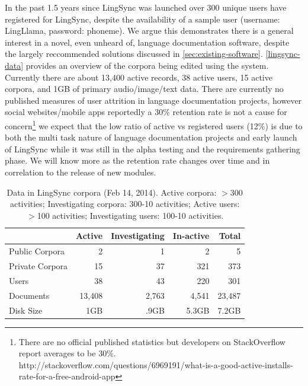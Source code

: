 \documentclass[11pt]{article}
\newcommand{\smalltodo}[2][]
    {\todo[caption={#2}, #1]
    {\tiny#2\normalsize}}
\begin{document}
In the past 1.5 years since LingSync was launched over 300  unique
users  have registered for LingSync, despite the availability of a sample user (username: LingLlama, password: phoneme). We argue this demonstrates there is a general interest in a novel, even  unheard of, language documentation software, despite the largely reccommended  solutions discussed in \autoref{sec:existing-software}.
\autoref{lingsync-data} provides an
overview of the corpora being edited using the system. Currently there are
about 13,400 active records, 38 active users, 15 active corpora, and 1GB of
primary audio/image/text data. There are currently no published measures of user attrition in language documentation projects, however social websites/mobile apps reportedly a  30\% retention rate is not a cause for concern\footnote{There are no official published statistics but developers on StackOverflow report averages to be 30\%. http://stackoverflow.com/questions/6969191/what-is-a-good-active-installs-rate-for-a-free-android-app} we expect that the low ratio of active vs registered users (12\%) is due to both the multi task nature of language documentation projects and early launch of LingSync while it was still in the alpha testing and the requirements gathering phase. We will know more as the retention rate changes over time and in correlation to the release of new modules.


\begin{table}[h]
\begin{center}
\scriptsize
\begin{tabular}{lrrrr}
      \toprule
                     ~ &  Active & Investigating & In-active & Total\\
      \midrule
      Public Corpora  &       2 &   1 &   2 & 5 \\ 
      Private Corpora &      15 &  37 & 321 & 373\\ 
      Users           &      38 &  43 & 220 & 301 \\
      Documents & 13,408 & 2,763 & 4,541 &23,487\\
      Disk Size & 1GB & .9GB & 5.3GB& 7.2GB\\
      
      \bottomrule

\end{tabular}
\caption{Data in LingSync corpora (Feb 14, 2014).
Active corpora: $>$300 activities; Investigating corpora: 300-10 activities; Active users: $>$100 activities; Investigating users: 100-10 activities.}
\label{lingsync-data}
 \end{center}
 \normalsize
\end{table}
\end{document}
